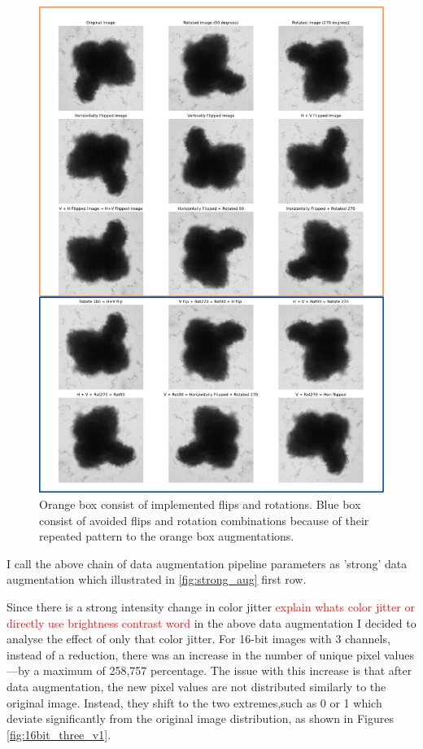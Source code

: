 \begin{figure}[H]
  \centering
  \includegraphics[scale=0.35]{figures/repeat.png} 
  \caption{Orange box consist of implemented flips and rotations. Blue box consist of avoided flips and rotation combinations because of their repeated pattern to
   the orange box augmentations.}
  \label{fig:repeat}
\end{figure}

I call the above chain of data augmentation pipeline parameters as 'strong' data augmentation which illustrated in \ref{fig:strong_aug} first row.

Since there is a strong intensity change in color jitter \textcolor{red}{ explain whats color jitter or directly use brightness contrast word} in the above data augmentation I decided to analyse the effect of only that color jitter. For 16-bit images
 with 3 channels, instead of a reduction, there was an increase in the number of unique pixel values—by a maximum of 258,757 percentage. The issue with this
  increase is that after data augmentation, the new pixel values are not distributed similarly to the original image. Instead, they shift to
 the two extremes,such as 0 or 1 which deviate significantly from the original image distribution, as shown in Figures \ref{fig:16bit_three_v1}.

